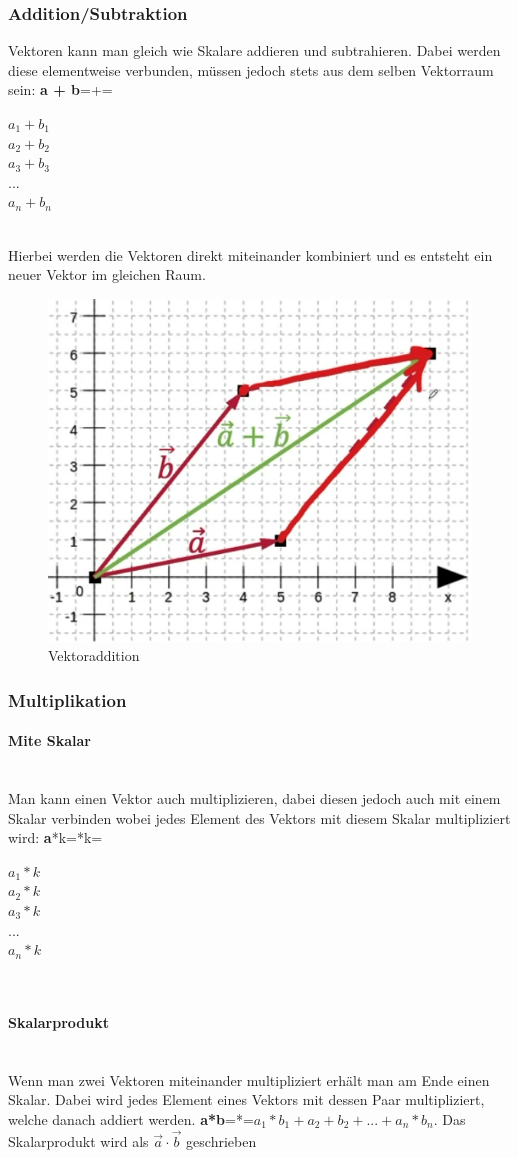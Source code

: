 \documentclass{article}
\newcommand{\paragraphlb}[1]{\paragraph{#1}\mbox{}\\}
\begin{document}
	\subsubsection{Addition/Subtraktion}
	Vektoren kann man gleich wie Skalare addieren und subtrahieren. Dabei werden diese elementweise verbunden, müssen jedoch stets aus dem selben Vektorraum sein: \textbf{a + b}=+=\begin{pmatrix} $a_1+b_1$ \\ $a_2+b_2$ \\ $a_3+b_3$ \\ ... \\ $a_n+b_n$\end{pmatrix} \\
	Hierbei werden die Vektoren direkt miteinander kombiniert und es entsteht ein neuer Vektor im gleichen Raum.
	\begin{figure}[H]
	\centering
	\includegraphics{Bilder/vector_add.png}
	\caption{Vektoraddition}
	\end{figure}
	\subsubsection{Multiplikation}
	\paragraphlb{Mite Skalar}
	Man kann einen Vektor auch multiplizieren, dabei diesen jedoch auch mit einem Skalar verbinden wobei jedes Element des Vektors mit diesem Skalar multipliziert wird: \textbf{a}*k=*k=\begin{pmatrix} $a_1*k$ \\ $a_2*k$ \\ $a_3*k$ \\ ... \\ $a_n*k$\end{pmatrix} \\
	\paragraphlb{Skalarprodukt}
	Wenn man zwei Vektoren miteinander multipliziert erhält man am Ende einen Skalar. Dabei wird jedes Element eines Vektors mit dessen Paar multipliziert, welche danach addiert werden. \textbf{a*b}=*=$a_1*b_1+a_2+b_2+...+a_n*b_n$. Das Skalarprodukt wird als $\vec{a}\cdot\vec{b}$ geschrieben
\end{document}
